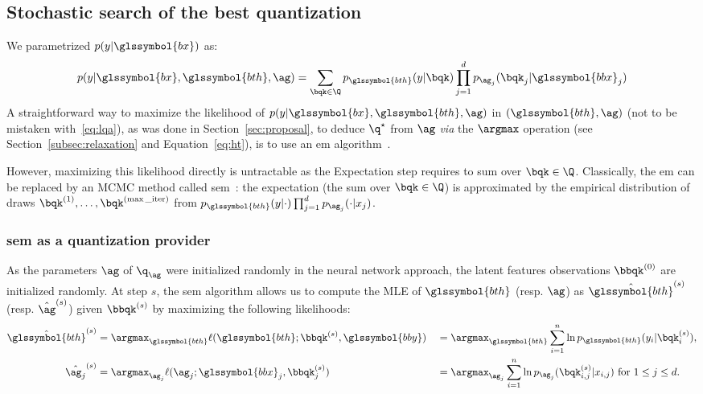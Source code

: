\subsection{Stochastic search of the best quantization} \label{subsec:stoch}

We parametrized $p(y|\glssymbol{bx})$ as:
\begin{equation}
p(y | \glssymbol{bx}, \glssymbol{bth}, \ag) = \sum_{\bqk \in \Q} p_{\glssymbol{bth}}(y | \bqk) \prod_{j=1}^d p_{\ag_j}(\bqk_j | \glssymbol{bbx}_j)
\end{equation}
A straightforward way to maximize the likelihood of $p(y | \glssymbol{bx}, \glssymbol{bth}, \ag)$ in $(\glssymbol{bth}, \ag)$ (not to be mistaken with~\eqref{eq:lqa}), as was done in Section~\ref{sec:proposal}, to deduce $\q^\star$ from $\ag$ \textit{via} the $\argmax$ operation (see Section~\ref{subsec:relaxation} and Equation~\eqref{eq:ht}), is to use an \gls{em} algorithm~\cite{dempster1977maximum}.

However, maximizing this likelihood directly is untractable as the Expectation step requires to sum over $\bqk \in \Q$. Classically, the \gls{em} can be replaced by an MCMC method called \acrlong{sem}~\cite{celeux1985sem}: the expectation (the sum over $\bqk \in \Q$) is approximated by the empirical distribution of draws $\bqk^{(1)}, \dots, \bqk^{(\max\_{\text{iter}})}$ from $p_{\glssymbol{bth}}(y | \cdot) \prod_{j=1}^d p_{\ag_j}(\cdot | x_j)$.

\subsubsection{\gls{sem} as a quantization provider}

As the parameters $\ag$ of $\q_{\ag}$ were initialized randomly in the neural network approach, the latent features observations $\bbqk^{(0)}$ are initialized randomly. At step $s$, the \gls{sem} algorithm allows us to compute the MLE of $\glssymbol{bth}$ (resp. $\ag$) as $\hat{\glssymbol{bth}}^{(s)}$ (resp. $\hat{\ag}^{(s)}$) given $\bbqk^{(s)}$ by maximizing the following likelihoods:
\begin{alignat}{2}
\hat{\glssymbol{bth}}^{(s)} & = \argmax_{\glssymbol{bth}} \ell(\glssymbol{bth}; \bbqk^{(s)}, \glssymbol{bby}) && = \argmax_{\glssymbol{bth}} \sum_{i=1}^n \ln p_{\glssymbol{bth}}(y_i | \bqk^{(s)}_i), \nonumber \\
\hat{\ag_j}^{(s)} & = \argmax_{\ag_j} \ell(\ag_j; \glssymbol{bbx}_j, \bbqk^{(s)}_j) && = \argmax_{\ag_j} \sum_{i=1}^n \ln p_{\ag_j}(\bqk^{(s)}_{i,j} | x_{i,j}) \text{ for } 1 \leq j \leq d. \label{eq:mle_ag}
\end{alignat}

